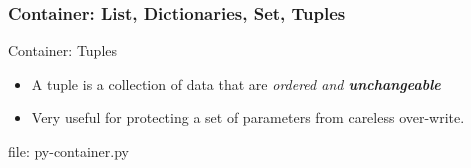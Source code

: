 \begin{frame}[fragile]
\frametitle{Container: List, Dictionaries, Set, Tuples}
\newcommand{\newfilename}{py-container.py}
Container: Tuples
\begin{itemize}
\item A tuple is a collection of data that are \emph{ordered and \textbf{unchangeable}}
\item Very useful for protecting a set of parameters from careless over-write.
\end{itemize}


file: \newfilename
\end{frame}
